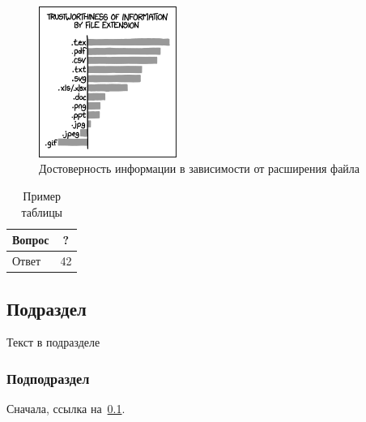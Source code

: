 \documentclass[intlimits,twoside,a4paper,11pt]{article}
\begin{document}
    \begin{figure}[htb]
        \centering
        \includegraphics[width=0.4\textwidth]{xkcd1301.png}
        \caption{Достоверность информации в зависимости от расширения файла} \label{fig-example}
    \end{figure}

    \begin{table}[H]
        \centering
        \caption{Пример таблицы}
        \label{table-example}
        \small
        \begin{tabular}{|p{5cm}|c|}
            \hline
            \centering
            Вопрос & ? \\
            \hline
            Ответ & 42 \\
            \hline
        \end{tabular}
    \end{table}

    \subsection{Подраздел}
    \label{sec:sub} %
    Текст в подразделе

    \subsubsection{Подподраздел}
    Сначала, ссылка на~\ref{sec:sub}.
\end{document}

